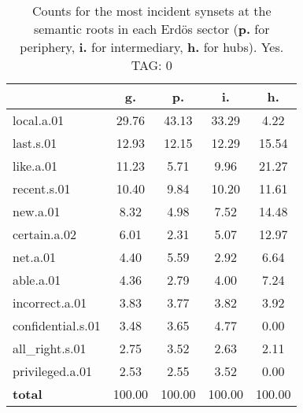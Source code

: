 \begin{table}[h!]
\begin{center}
\begin{tabular}{| l | c | c | c | c |}\hline
 & g. & p. & i. & h. \\\hline
local.a.01 & 29.76  & 43.13  & 33.29  & 4.22 \\\hline
last.s.01 & 12.93  & 12.15  & 12.29  & 15.54 \\\hline
like.a.01 & 11.23  & 5.71  & 9.96  & 21.27 \\\hline
recent.s.01 & 10.40  & 9.84  & 10.20  & 11.61 \\\hline
new.a.01 & 8.32  & 4.98  & 7.52  & 14.48 \\\hline
certain.a.02 & 6.01  & 2.31  & 5.07  & 12.97 \\\hline
net.a.01 & 4.40  & 5.59  & 2.92  & 6.64 \\\hline
able.a.01 & 4.36  & 2.79  & 4.00  & 7.24 \\\hline
incorrect.a.01 & 3.83  & 3.77  & 3.82  & 3.92 \\\hline
confidential.s.01 & 3.48  & 3.65  & 4.77  & 0.00 \\\hline
all\_right.s.01 & 2.75  & 3.52  & 2.63  & 2.11 \\\hline
privileged.a.01 & 2.53  & 2.55  & 3.52  & 0.00 \\\hline
{{\bf total}} & 100.00  & 100.00  & 100.00  & 100.00 \\\hline
\end{tabular}
\caption{Counts for the most incident synsets at the semantic roots in each Erd\"os sector ({\bf p.} for periphery, {\bf i.} for intermediary, {\bf h.} for hubs). Yes. TAG: 0}
\end{center}
\end{table}
